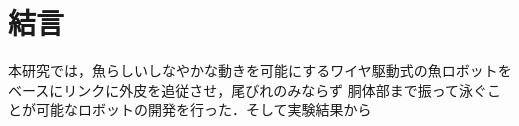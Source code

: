 \newpage
\section{結言}
本研究では，魚らしいしなやかな動きを可能にするワイヤ駆動式の魚ロボットをベースにリンクに外皮を追従させ，尾びれのみならず
胴体部まで振って泳ぐことが可能なロボットの開発を行った．そして実験結果から

